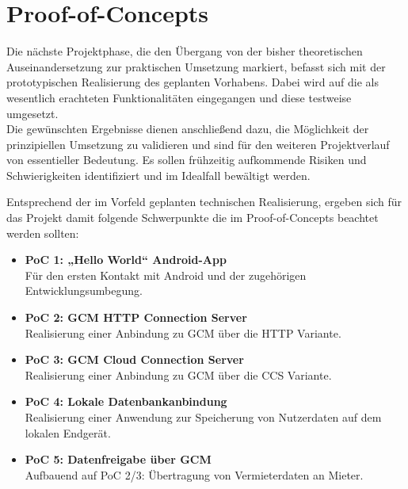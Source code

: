 
\section{Proof-of-Concepts}
Die nächste Projektphase, die den Übergang von der bisher theoretischen Auseinandersetzung zur praktischen Umsetzung markiert, befasst sich mit der prototypischen Realisierung des geplanten Vorhabens. Dabei wird auf die als wesentlich erachteten  Funktionalitäten eingegangen und diese testweise umgesetzt.\\
Die gewünschten Ergebnisse dienen anschließend dazu, die Möglichkeit der prinzipiellen Umsetzung zu validieren und sind für den weiteren Projektverlauf von essentieller Bedeutung. Es sollen frühzeitig aufkommende Risiken und Schwierigkeiten identifiziert  und im Idealfall bewältigt werden.

\vspace{0.5cm}

Entsprechend der im Vorfeld geplanten technischen Realisierung, ergeben sich für das Projekt damit folgende Schwerpunkte die im Proof-of-Concepts beachtet werden sollten:\\
\begin{itemize}
   \item \textbf{PoC 1: „Hello World“ Android-App} \\
   Für den ersten Kontakt mit Android und der zugehörigen Entwicklungsumbegung.
   \item \textbf{PoC 2: GCM HTTP Connection Server} \\
   Realisierung einer Anbindung zu GCM über die HTTP Variante.
   \item \textbf{PoC 3: GCM Cloud Connection Server} \\
   Realisierung einer Anbindung zu GCM über die CCS Variante.
   \item \textbf{PoC 4: Lokale Datenbankanbindung} \\
   Realisierung einer Anwendung zur Speicherung von Nutzerdaten auf dem lokalen Endgerät.
   \item \textbf{PoC 5: Datenfreigabe über GCM} \\
   Aufbauend auf PoC 2/3: Übertragung von Vermieterdaten an Mieter.
\end{itemize}
